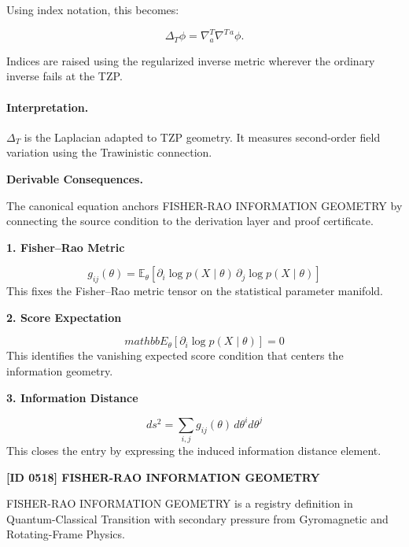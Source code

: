 Using index notation, this becomes:

\begin{equation}
\boxed{
\Delta_T\phi
=
\nabla^{T}_{a}\nabla^{T\,a}\phi .
}
\end{equation}

Indices are raised using the regularized inverse metric wherever the ordinary inverse fails at the TZP.

\paragraph{Interpretation.}
$\Delta_T$ is the Laplacian adapted to TZP geometry. It measures second-order field variation using the Trawinistic connection.

\par\vspace{0.35em}
\noindent\textbf{Derivable Consequences.}\quad
\begingroup
\footnotesize
\raggedright
The canonical equation anchors FISHER-RAO INFORMATION GEOMETRY by connecting the source condition to the derivation layer and proof certificate.
\par\endgroup

\noindent\textbf{1. Fisher--Rao Metric}\par
\[
g_{ij}(\theta)=\mathbb{E}_{\theta}\!\left[\partial_i\log p(X\mid\theta)\,\partial_j\log p(X\mid\theta)\right]
\]
\noindent This fixes the Fisher--Rao metric tensor on the statistical parameter manifold.\par
\noindent\textbf{2. Score Expectation}\par
\[
mathbb{E}_{\theta}\!\left[\partial_i\log p(X\mid\theta)\right]=0
\]
\noindent This identifies the vanishing expected score condition that centers the information geometry.\par
\noindent\textbf{3. Information Distance}\par
\[
ds^2=\sum_{i,j} g_{ij}(\theta)\,d\theta^i d\theta^j
\]
\noindent This closes the entry by expressing the induced information distance element.\par

\clearpage
\noindent\textbf{[ID 0518] FISHER-RAO INFORMATION GEOMETRY}\par
\vspace{0.35em}
\begingroup\small
{}
FISHER-RAO INFORMATION GEOMETRY is a registry definition in Quantum-Classical Transition with secondary pressure from Gyromagnetic and Rotating-Frame Physics.

